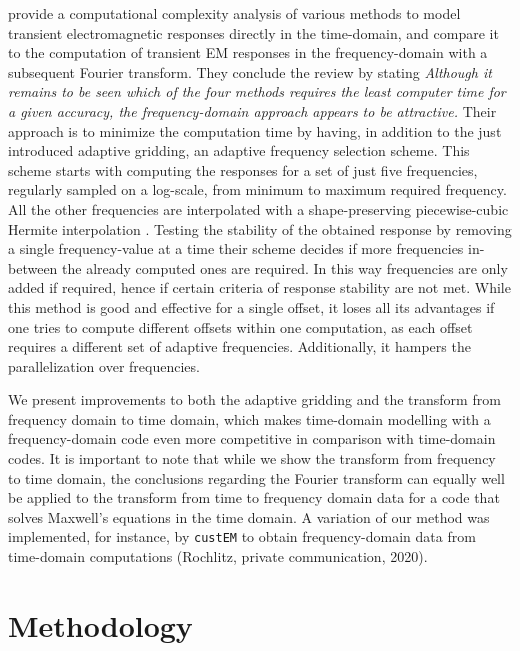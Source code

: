 \documentclass[
    manuscript,
    revised,
  ]{geophysics}
\newcommand{\custem}{\texttt{custEM}\xspace}
\begin{document}
\cite{GEO.08.Mulder} provide a computational complexity analysis of various
methods to model transient electromagnetic responses directly in the
time-domain, and compare it to the computation of transient EM responses in the
frequency-domain with a subsequent Fourier transform. They conclude the review
by stating \emph{\guillemotleft Although it remains to be seen which of the
four methods requires the least computer time for a given accuracy, the
frequency-domain approach appears to be attractive.\guillemotright} Their
approach is to minimize the computation time by having, in addition to the just
introduced adaptive gridding, an adaptive frequency selection scheme. This
scheme starts with computing the responses for a set of just five frequencies,
regularly sampled on a log-scale, from minimum to maximum required frequency.
All the other frequencies are interpolated with a shape-preserving
piecewise-cubic Hermite interpolation \citep[PCHIP, ][]{SIAM.80.Fritsch}.
Testing the stability of the obtained response by removing a single
frequency-value at a time their scheme decides if more frequencies in-between
the already computed ones are required. In this way frequencies are only added
if required, hence if certain criteria of response stability are not met. While
this method is good and effective for a single offset, it loses all its
advantages if one tries to compute different offsets within one computation, as
each offset requires a different set of adaptive frequencies. Additionally, it
hampers the parallelization over frequencies.

We present improvements to both the adaptive gridding and the transform from
frequency domain to time domain, which makes time-domain modelling with a
frequency-domain code even more competitive in comparison with time-domain
codes. It is important to note that while we show the transform from frequency
to time domain, the conclusions regarding the Fourier transform can equally
well be applied to the transform from time to frequency domain data for a code
that solves Maxwell's equations in the time domain. A variation of our method
was implemented, for instance, by \custem \citep{GEO.19.Rochlitz} to obtain
frequency-domain data from time-domain computations (Rochlitz, private
communication, 2020).

\section{Methodology}
\end{document}
